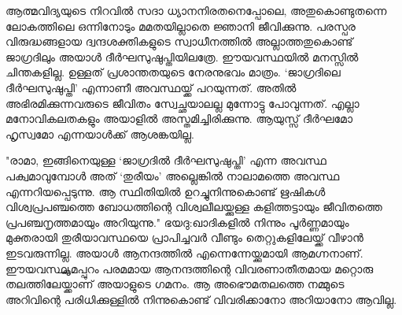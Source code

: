 ആത്മവിദ്യയുടെ നിറവില്‍ സദാ ധ്യാനനിരതനെപ്പോലെ, അതുകൊണ്ടുതന്നെ ലോകത്തിലെ ഒന്നിനോടും മമതയില്ലാതെ ജ്ഞാനി ജീവിക്കുന്നു. പരസ്പര വിരുദ്ധങ്ങളായ ദ്വന്ദശക്തികളുടെ സ്വാധീനത്തില്‍ അല്ലാത്തതുകൊണ്ട് ജാഗ്രദിലും അയാള്‍ ദീര്‍ഘസുഷുപ്തിയിലത്രേ. ഈയവസ്ഥയില്‍ മനസ്സില്‍ ചിന്തകളില്ല. ഉള്ളത് പ്രശാന്തതയുടെ നേരനുഭവം മാത്രം. ‘ജാഗ്രദിലെ ദീര്‍ഘസുഷുപ്തി’ എന്നാണീ അവസ്ഥയ്ക്ക് പറയുന്നത്. അതില്‍ അഭിരമിക്കുന്നവരുടെ ജീവിതം സ്വേച്ഛയാലല്ല മുന്നോട്ടു പോവുന്നത്. എല്ലാ മനോവികലതകളും അയാളില്‍ അസ്തമിച്ചിരിക്കുന്നു. ആയുസ്സ് ദീര്‍ഘമോ ഹൃസ്വമോ എന്നയാള്‍ക്ക് ആശങ്കയില്ല.  

"രാമാ, ഇങ്ങിനെയുള്ള ‘ജാഗ്രദില്‍ ദീര്‍ഘസുഷുപ്തി’ എന്ന അവസ്ഥ പക്വമാവുമ്പോള്‍ അത് ‘തുരീയം’ അല്ലെങ്കില്‍ നാലാമത്തെ അവസ്ഥ എന്നറിയപ്പെടുന്നു. ആ സ്ഥിതിയില്‍ ഉറച്ചുനിന്നുകൊണ്ട് ഋഷികള്‍ വിശ്വപ്രപഞ്ചത്തെ ബോധത്തിന്റെ വിശ്വലീലയ്ക്കുള്ള  കളിത്തട്ടായും  ജീവിതത്തെ പ്രപഞ്ചനൃത്തമായും അറിയുന്നു." ഭയദു:ഖാദികളില്‍ നിന്നും പൂര്‍ണ്ണമായും മുക്തരായി തുരീയാവസ്ഥയെ പ്രാപിച്ചവര്‍ വീണ്ടും തെറ്റുകളിലേയ്ക്ക് വീഴാന്‍ ഇടവരുന്നില്ല. അയാള്‍ ആനന്ദത്തില്‍ എന്നെന്നേയ്ക്കുമായി ആമഗ്നനാണ്. ഈയവസ്ഥ്യ്ക്കുമപ്പുറം പരമമായ ആനന്ദത്തിന്റെ വിവരണാതീതമായ മറ്റൊരു തലത്തിലേയ്ക്കാണ് അയാളുടെ ഗമനം. ആ അഭൌമതലത്തെ നമ്മുടെ അറിവിന്റെ പരിധിക്കുള്ളില്‍ നിന്നുകൊണ്ട് വിവരിക്കാനോ അറിയാനോ ആവില്ല.

